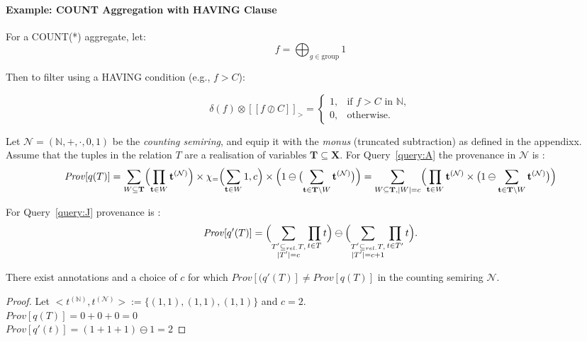 \begin{toappendix}
\paragraph{Example: COUNT Aggregation with HAVING Clause}

For a COUNT(*) aggregate, let:
\[
f = \bigoplus_{g \in \text{group}} 1
\]

Then to filter using a HAVING condition (e.g., \( f > C \)):

\[
\delta(f) \otimes [[f \oslash C]]_{>} =
\begin{cases}
1, & \text{if } f > C \text{ in } \mathbb{N}, \\
0, & \text{otherwise.}
\end{cases}
\]

\end{toappendix}
Let $\mathcal{N} = (\mathbb{N},+,\cdot,0,1)$ be the \emph{counting semiring}, and equip it with the \emph{monus} (truncated subtraction) 
as defined in the appendixx. Assume that the tuples in the relation $T$ are a realisation of variables $\mathbf{T}\subseteq\mathbf{X}$.
For Query~\ref{query:A} the provenance in \(\mathcal{N}\) is :
\[
  \mathit{Prov}[q(T)]
  =
  \sum_{W\subseteq \mathbf{T}}
    \Bigl(\prod_{\mathbf{t}\in W}\mathbf{t}^{(\mathcal{N})}\Bigr)\times\chi_{=}\Bigl(\sum_{\mathbf{t}\in W} 1, c\Bigr)\times\Bigl(1 \ominus \bigl(\sum_{\mathbf{t}\in\mathbf{T}\setminus W}\mathbf{t}^{(\mathcal{N})}\bigr)\Bigr)
  =
  \sum_{W\subseteq \mathbf{T}, |W|=c}
    \Bigl(\prod_{\mathbf{t}\in W}\mathbf{t}^{(\mathcal{N})}\times\bigl(1\ominus\sum_{\mathbf{t}\in\mathbf{T}\setminus W}\mathbf{t}^{(\mathcal{N})}\bigr)\Bigr)
\]

For Query~\ref{query:J} provenance is :
\[
  \mathit{Prov}[q'(T)]
  =
  \Bigl(\sum_{\substack{T'\subseteq_{rel.}T ,\\|T'|=c}}\prod_{t\in T}t\Bigr)
  \ominus
  \Bigl(\sum_{\substack{T'\subseteq_{rel.}T,\\|T'|=c+1}}\prod_{t\in T'}t\Bigr).
\]

\begin{proposition}
There exist annotations and a choice of \(c\) for which
  \(\mathit{Prov}[(q'(T)]\neq\mathit{Prov}[q(T)]\)
in the counting semiring \(\mathcal{N}\).
\end{proposition}

\begin{proof}
  Let $<t^{(\mathbb{N})},t^{(\mathcal{N})}> :=\{(1,1),(1,1),(1,1)\}$ and $c=2$.\\
  $\mathit{Prov}[q(T)]=0+0+0=0$\\
  $\mathit{Prov}[q'(t)]=(1+1+1)\ominus 1=2$

\end{proof}

